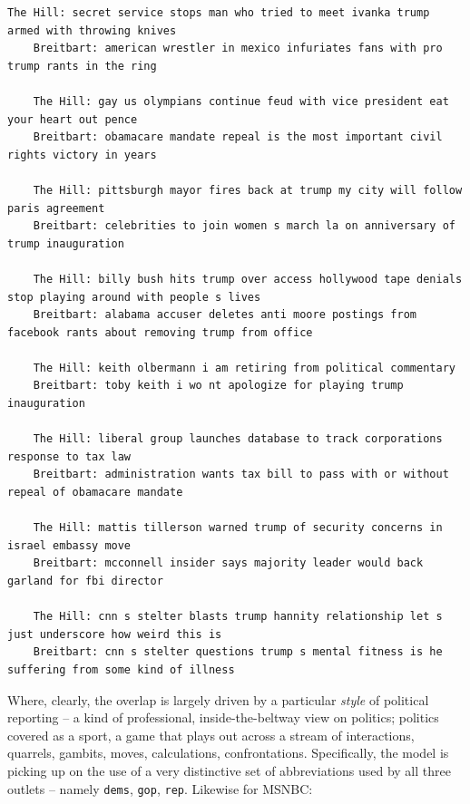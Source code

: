 \documentclass{scrartcl}
\begin{document}
\begin{lstlisting}[basicstyle=\tiny\hlfont]
    The Hill: secret service stops man who tried to meet ivanka trump armed with throwing knives
    Breitbart: american wrestler in mexico infuriates fans with pro trump rants in the ring

    The Hill: gay us olympians continue feud with vice president eat your heart out pence
    Breitbart: obamacare mandate repeal is the most important civil rights victory in years

    The Hill: pittsburgh mayor fires back at trump my city will follow paris agreement
    Breitbart: celebrities to join women s march la on anniversary of trump inauguration

    The Hill: billy bush hits trump over access hollywood tape denials stop playing around with people s lives
    Breitbart: alabama accuser deletes anti moore postings from facebook rants about removing trump from office

    The Hill: keith olbermann i am retiring from political commentary
    Breitbart: toby keith i wo nt apologize for playing trump inauguration

    The Hill: liberal group launches database to track corporations response to tax law
    Breitbart: administration wants tax bill to pass with or without repeal of obamacare mandate

    The Hill: mattis tillerson warned trump of security concerns in israel embassy move
    Breitbart: mcconnell insider says majority leader would back garland for fbi director

    The Hill: cnn s stelter blasts trump hannity relationship let s just underscore how weird this is
    Breitbart: cnn s stelter questions trump s mental fitness is he suffering from some kind of illness
\end{lstlisting}

Where, clearly, the overlap is largely driven by a particular \textit{style} of political reporting -- a kind of professional, inside-the-beltway view on politics; politics covered as a sport, a game that plays out across a stream of interactions, quarrels, gambits, moves, calculations, confrontations. Specifically, the model is picking up on the use of a very distinctive set of abbreviations used by all three outlets -- namely \texttt{dems}, \texttt{gop}, \texttt{rep}. Likewise for MSNBC:
\end{document}
